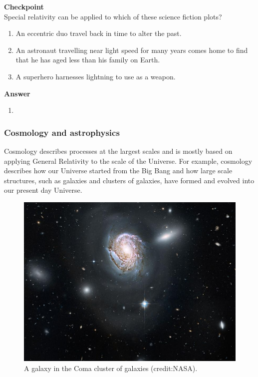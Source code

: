 \documentclass[9pt,Preprint]{lapreprint}
\begin{document}
\begin{framed}
\textbf{Checkpoint}\\
Special relativity can be applied to which of these science fiction plots?

\begin{enumerate}
\item An eccentric duo travel back in time to alter the past.
\item An astronaut travelling near light speed for many years comes home to find that he has aged less than his family on Earth.
\item A superhero harnesses lightning to use as a weapon.
\end{enumerate}

\begin{framed}
\textbf{Answer}\\
\begin{enumerate}[resume]
\item
\end{enumerate}
\end{framed}
\end{framed}

\subsubsection{Cosmology and astrophysics}

Cosmology describes processes at the largest scales and is mostly based on applying General Relativity to the scale of the Universe. For example, cosmology describes how our Universe started from the Big Bang and how large scale structures, such as galaxies and clusters of galaxies, have formed and evolved into our present day Universe.

\begin{figure}[!htbp]
\centering
\includegraphics[width=0.6\linewidth]{files/galaxies_in_Coma_clu-2efab0f27a437395c54cadf99cecdeb8.jpeg}
\caption[]{A galaxy in the Coma cluster of galaxies (credit:NASA).}
\label{fig:introduction:galaxiescomacluster}
\end{figure}
\end{document}
